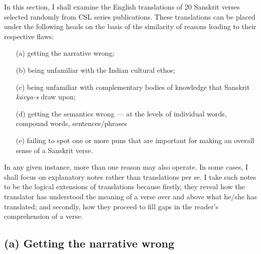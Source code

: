 In this section, I shall examine the English translations of 20 Sanskrit verses selected randomly from CSL series publications. These translations can be placed under the following heads on the basis of the similarity of reasons leading to their respective flaws: 
\begin{itemize}
\itemsep=1pt
\item[(a)] getting the narrative wrong; 
\item[(b)] being unfamiliar with the Indian cultural ethos; 
\item[(c)] being unfamiliar with complementary bodies of knowledge that Sanskrit \textsl{kāvya-s} draw upon; 
\item[(d)] getting the semantics wrong --- at the levels of individual words, compound words, sentences/phrases 
\item[(e)] failing to spot one or more puns that are important for making an overall sense of a Sanskrit verse. 
\end{itemize}

In any given instance, more than one reason may also operate. In some cases, I shall focus on explanatory notes rather than translations per se. I take such notes to be the logical extensions of translations because firstly, they reveal how the translator has understood the meaning of a verse over and above what he/she has translated; and secondly, how they proceed to fill gaps in the reader’s comprehension of a verse. 

\subsection*{(a) Getting the narrative wrong} 

